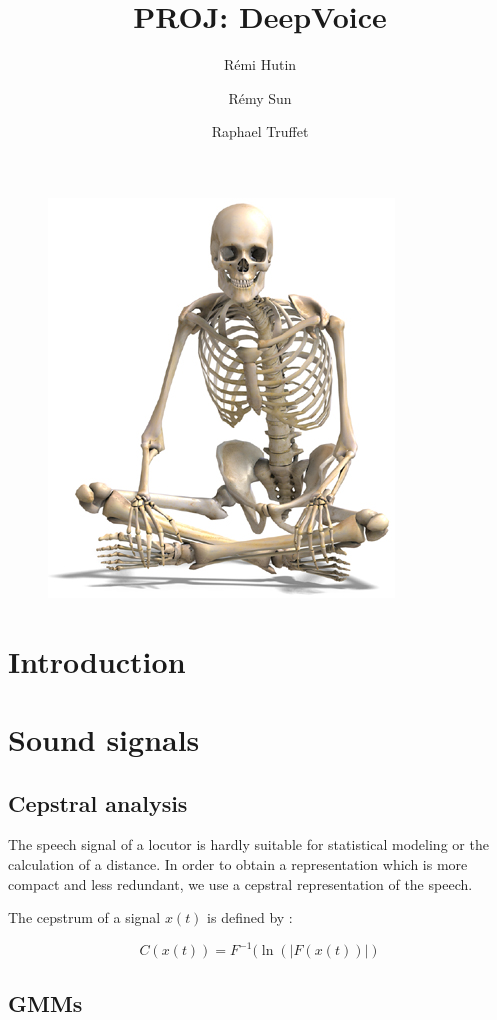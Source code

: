 \documentclass[conference]{IEEEtran}
\title{PROJ: DeepVoice}
\author{Rémi Hutin \and Rémy Sun \and Raphael Truffet}
\begin{document}
\maketitle


\begin{figure}[!h]
    \centering
    \includegraphics[scale=2]{squelette.jpg}
\end{figure}

\section{Introduction}

\section{Sound signals}

\subsection{Cepstral analysis}

The speech signal of a locutor is hardly suitable for statistical modeling or the calculation of a distance.
In order to obtain a representation which is more compact and less redundant, we use a cepstral representation of the speech.

The cepstrum of a signal $x(t)$ is defined by :

$$C(x(t)) = F^{-1}(\ln(|F(x(t))|)$$

\subsection{GMMs}
\end{document}
